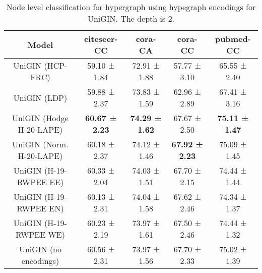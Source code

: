 \begin{table}[H]
\footnotesize
\centering
\begin{tabular}{|c|c|c|c|c|}
\hline
Model & citeseer-CC & cora-CA & cora-CC & pubmed-CC \\
\hline
UniGIN (HCP-FRC) & 59.10 ± 1.84 & 72.91 ± 1.88 & 57.77 ± 3.10 & 65.55 ± 2.40 \\
UniGIN (LDP) & 59.88 ± 2.37 & 73.83 ± 1.59 & 62.96 ± 2.89 & 67.41 ± 3.16 \\
UniGIN (Hodge H-20-LAPE) & \textbf{60.67 ± 2.23} & \textbf{74.29 ± 1.62} & 67.67 ± 2.50 & \textbf{75.11 ± 1.47} \\
UniGIN (Norm. H-20-LAPE) & 60.18 ± 2.37 & 74.12 ± 1.46 & \textbf{67.92 ± 2.23} & 75.09 ± 1.45 \\
UniGIN (H-19-RWPEE EE) & 60.33 ± 2.04 & 74.03 ± 1.51 & 67.70 ± 2.15 & 74.44 ± 1.44 \\
UniGIN (H-19-RWPEE EN) & 60.13 ± 2.31 & 74.04 ± 1.58 & 67.62 ± 2.46 & 74.34 ± 1.37 \\
UniGIN (H-19-RWPEE WE) & 60.23 ± 2.19 & 73.97 ± 1.61 & 67.50 ± 2.46 & 74.44 ± 1.32 \\
\hline
UniGIN (no encodings) & 60.56 ± 2.31 & 73.97 ± 1.56 & 67.70 ± 2.33 & 75.02 ± 1.39 \\
\hline
\end{tabular}
\caption{Node level classification for hypergraph using hypegraph encodings for UniGIN. The depth is 2.}
\label{tab:hg_node_classification_UniGIN}
\end{table}

